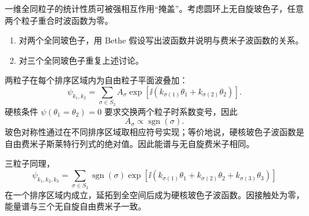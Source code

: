 \begin{question}
一维全同粒子的统计性质可被强相互作用“掩盖”。考虑圆环上无自旋玻色子，任意两个粒子重合时波函数为零。
\begin{enumerate}
  \item 对两个全同玻色子，用 Bethe 假设写出波函数并说明与费米子波函数的关系。
  \item 对三个全同玻色子重复上述讨论。
\end{enumerate}
\begin{solution}
两粒子在每个排序区域内为自由粒子平面波叠加：
\[
  \psi_{k_1,k_2}=\sum_{\sigma\in S_2}A_\sigma
  \exp[\ii(k_{\sigma(1)}\theta_1+k_{\sigma(2)}\theta_2)].
\]
硬核条件 $\psi(\theta_1=\theta_2)=0$ 要求交换两个粒子时系数变号，因此
\[
  A_\sigma\propto \operatorname{sgn}(\sigma).
\]
玻色对称性通过在不同排序区域取相应符号实现；等价地说，硬核玻色子波函数是自由费米子斯莱特行列式的绝对值。因此能谱与无自旋费米子相同。

三粒子同理，
\[
  \psi_{k_1,k_2,k_3}=\sum_{\sigma\in S_3}\operatorname{sgn}(\sigma)
  \exp[\ii(k_{\sigma(1)}\theta_1+k_{\sigma(2)}\theta_2+k_{\sigma(3)}\theta_3)]
\]
在一个排序区域内成立，延拓到全空间后成为硬核玻色子波函数。因接触处为零，能量谱与三个无自旋自由费米子一致。
\end{solution}
\end{question}

